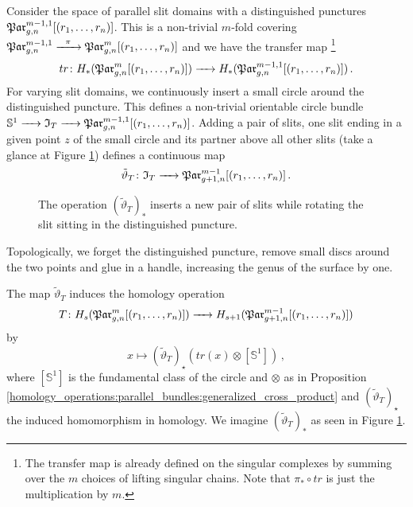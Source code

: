 \label{page:transfer_map}%
Consider the space of parallel slit domains with a distinguished punctures $\Par_{g,n}^{m-1,1}[(r_1, \ldots, r_n)]$.
This is a non-trivial $m$-fold covering $\Par_{g,n}^{m-1,1} \xr{\pi} \Par_{g,n}^m[(r_1, \ldots, r_n)]$ and
we have the transfer map%
\footnote{%
    The transfer map is already defined on the singular complexes by summing over the $m$ choices of lifting singular chains.
    Note that $\pi_\ast \circ tr$ is just the multiplication by $m$.
}%
\[
    tr \colon H_\ast(\Par_{g,n}^m[(r_1, \ldots, r_n)]) \to H_\ast(\Par_{g,n}^{m-1,1}[(r_1, \ldots, r_n)])\,. 
\]
For varying slit domains, we continuously insert a small circle around the distinguished puncture.
This defines a non-trivial orientable circle bundle $\mathbb S^1 \to \mathfrak I_T \to \Par_{g,n}^{m-1,1}[(r_1, \ldots, r_n)]$.
Adding a pair of slits, one slit ending in a given point $z$ of the small circle and its partner above all other slits (take a glance at Figure \ref{homology_operations:parallel_bundles:operation_t})
defines a continuous map
\label{page:operation_map_t}%
\[
    \tilde\vartheta_T \colon \mathfrak I_T \to \Par_{g+1,n}^{m-1}[(r_1, \ldots, r_n)] \,.
\]
\begin{figure}[ht]
    \centering
    \caption{\label{homology_operations:parallel_bundles:operation_t}%
        The operation $(\tilde\vartheta_T)_\ast$ inserts a new pair of slits while rotating the slit sitting in the distinguished puncture.}
\end{figure}
Topologically, we forget the distinguished puncture, remove small discs around the two points and glue in a handle, increasing the genus of the surface by one.
\begin{defi}
    \label{homology_operations:parallel_bundles:def_operation_t}
    The map $\tilde\vartheta_T$ induces the homology operation
    \[
        T \colon H_s(\Par_{g,n}^m[(r_1, \ldots, r_n)]) \to H_{s+1}(\Par_{g+1,n}^{m-1}[(r_1, \ldots, r_n)])
    \]
    by
    \[
        x \mapsto (\tilde\vartheta_T)_\star( tr(x) \otimes [\mathbb S^1]) \,,
    \]
    where $[\mathbb S^1]$ is the fundamental class of the circle and $\otimes$ as in Proposition \ref{homology_operations:parallel_bundles:generalized_cross_product}
    and $(\tilde\vartheta_T)_\star$ the induced homomorphism in homology.
    We imagine $(\tilde\vartheta_T)_\ast$ as seen in Figure \ref{homology_operations:parallel_bundles:operation_t}.
\end{defi}

